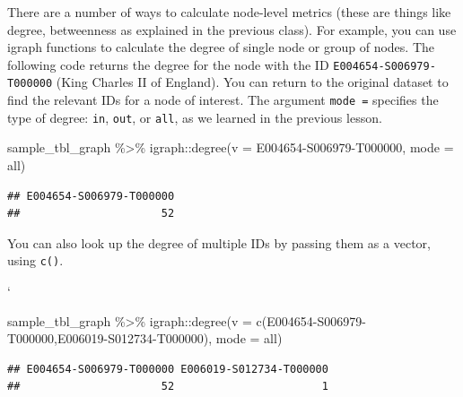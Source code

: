 \documentclass[
]{book}
\newenvironment{Shaded}{\begin{snugshade}}{\end{snugshade}}
\newcommand{\AttributeTok}[1]{\textcolor[rgb]{0.77,0.63,0.00}{#1}}
\newcommand{\FunctionTok}[1]{\textcolor[rgb]{0.00,0.00,0.00}{#1}}
\newcommand{\NormalTok}[1]{#1}
\newcommand{\SpecialCharTok}[1]{\textcolor[rgb]{0.00,0.00,0.00}{#1}}
\newcommand{\StringTok}[1]{\textcolor[rgb]{0.31,0.60,0.02}{#1}}
\begin{document}
There are a number of ways to calculate node-level metrics (these are things like degree, betweenness as explained in the previous class). For example, you can use igraph functions to calculate the degree of single node or group of nodes. The following code returns the degree for the node with the ID \texttt{E004654-S006979-T000000} (King Charles II of England). You can return to the original dataset to find the relevant IDs for a node of interest. The argument \texttt{mode\ =} specifies the type of degree: \texttt{in}, \texttt{out}, or \texttt{all}, as we learned in the previous lesson.

\begin{Shaded}
\begin{Highlighting}[]
\NormalTok{sample\_tbl\_graph }\SpecialCharTok{\%\textgreater{}\%}\NormalTok{ igraph}\SpecialCharTok{::}\FunctionTok{degree}\NormalTok{(}\AttributeTok{v =} \StringTok{\textquotesingle{}E004654{-}S006979{-}T000000\textquotesingle{}}\NormalTok{, }\AttributeTok{mode =} \StringTok{\textquotesingle{}all\textquotesingle{}}\NormalTok{) }
\end{Highlighting}
\end{Shaded}

\begin{verbatim}
## E004654-S006979-T000000 
##                      52
\end{verbatim}

You can also look up the degree of multiple IDs by passing them as a vector, using \texttt{c()}.

`

\begin{Shaded}
\begin{Highlighting}[]
\NormalTok{sample\_tbl\_graph }\SpecialCharTok{\%\textgreater{}\%}\NormalTok{ igraph}\SpecialCharTok{::}\FunctionTok{degree}\NormalTok{(}\AttributeTok{v =} \FunctionTok{c}\NormalTok{(}\StringTok{\textquotesingle{}E004654{-}S006979{-}T000000\textquotesingle{}}\NormalTok{,}\StringTok{\textquotesingle{}E006019{-}S012734{-}T000000\textquotesingle{}}\NormalTok{), }\AttributeTok{mode =} \StringTok{\textquotesingle{}all\textquotesingle{}}\NormalTok{) }
\end{Highlighting}
\end{Shaded}

\begin{verbatim}
## E004654-S006979-T000000 E006019-S012734-T000000 
##                      52                       1
\end{verbatim}
\end{document}
